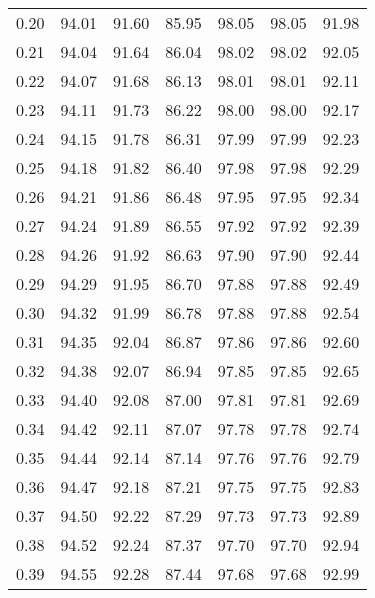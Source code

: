 \begin{tabular}{|c|c|c|c|c|c|c|}
      0.20 &     94.01 &     91.60 &      85.95 &   98.05 &      98.05 &         91.98 \\
      0.21 &     94.04 &     91.64 &      86.04 &   98.02 &      98.02 &         92.05 \\
      0.22 &     94.07 &     91.68 &      86.13 &   98.01 &      98.01 &         92.11 \\
      0.23 &     94.11 &     91.73 &      86.22 &   98.00 &      98.00 &         92.17 \\
      0.24 &     94.15 &     91.78 &      86.31 &   97.99 &      97.99 &         92.23 \\
      0.25 &     94.18 &     91.82 &      86.40 &   97.98 &      97.98 &         92.29 \\
      0.26 &     94.21 &     91.86 &      86.48 &   97.95 &      97.95 &         92.34 \\
      0.27 &     94.24 &     91.89 &      86.55 &   97.92 &      97.92 &         92.39 \\
      0.28 &     94.26 &     91.92 &      86.63 &   97.90 &      97.90 &         92.44 \\
      0.29 &     94.29 &     91.95 &      86.70 &   97.88 &      97.88 &         92.49 \\
      0.30 &     94.32 &     91.99 &      86.78 &   97.88 &      97.88 &         92.54 \\
      0.31 &     94.35 &     92.04 &      86.87 &   97.86 &      97.86 &         92.60 \\
      0.32 &     94.38 &     92.07 &      86.94 &   97.85 &      97.85 &         92.65 \\
      0.33 &     94.40 &     92.08 &      87.00 &   97.81 &      97.81 &         92.69 \\
      0.34 &     94.42 &     92.11 &      87.07 &   97.78 &      97.78 &         92.74 \\
      0.35 &     94.44 &     92.14 &      87.14 &   97.76 &      97.76 &         92.79 \\
      0.36 &     94.47 &     92.18 &      87.21 &   97.75 &      97.75 &         92.83 \\
      0.37 &     94.50 &     92.22 &      87.29 &   97.73 &      97.73 &         92.89 \\
      0.38 &     94.52 &     92.24 &      87.37 &   97.70 &      97.70 &         92.94 \\
      0.39 &     94.55 &     92.28 &      87.44 &   97.68 &      97.68 &         92.99 \\

\end{tabular}
